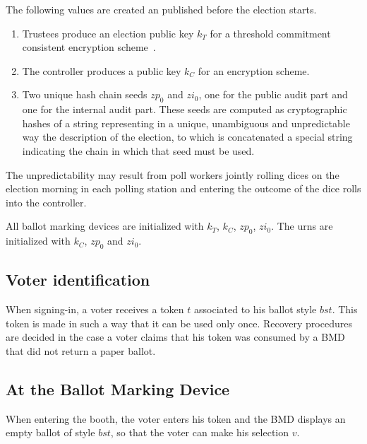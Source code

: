 \documentclass[prodmode]{acmsmall}
\newcommand{\kt}{\ensuremath{k_T}\xspace}
\newcommand{\kc}{\ensuremath{k_C}\xspace}
\newcommand{\zp}{\ensuremath{zp}\xspace}
\newcommand{\zi}{\ensuremath{zi}\xspace}
\newcommand{\bst}{\ensuremath{bst}\xspace}   %
\newcommand{\bmd}{\textsf{BMD}\xspace}       %
\newcommand{\token}{\ensuremath{t}\xspace}   %
\newcommand{\vote}{\ensuremath{v}\xspace} %
\begin{document}
The following values are created an published before the election
starts.
\begin{enumerate}
\item Trustees produce an election public key \kt for a threshold
  commitment consistent encryption scheme~\cite{CPP13}.
\item The controller produces a public key \kc for an encryption
  scheme.
\item Two unique hash chain seeds $\zp_0$ and $\zi_0$, one for the
  public audit part and one for the internal audit part. These seeds
  are computed as cryptographic hashes of a string representing in a
  unique, unambiguous and unpredictable way the description of the
  election, to which is concatenated a special string indicating the
  chain in which that seed must be
  used. 
\end{enumerate}
The unpredictability may result from poll workers jointly rolling
dices on the election morning in each polling station and entering the
outcome of the dice rolls into the controller. 

All ballot marking devices are initialized with \kt, \kc,
$\zp_0$, $\zi_0$. The urns are initialized with \kc, $\zp_0$ and
$\zi_0$.




\subsection{Voter identification}
\label{sec:voter-identification}
When signing-in, a voter receives a token \token associated to his
ballot style \bst. This token is made in such a way that it can be
used only once. 
%
Recovery procedures are decided in the case a voter
claims that his token was consumed by a \bmd that did not return a
paper ballot.




\subsection{At the Ballot Marking Device}
\label{sec:at-ballot-marking}

When entering the booth, the voter enters his token and the \bmd
displays an empty ballot of style \bst, so that the voter can make his
selection $\vote$.
\end{document}
